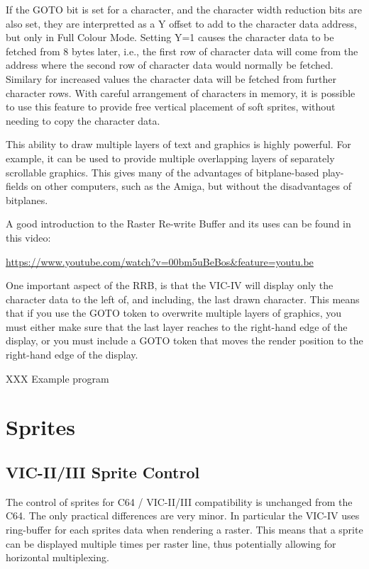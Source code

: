 If the GOTO bit is set for a character, and the character width reduction bits are also set, they are interpretted as a Y offset to add to the character data address, but only in Full Colour Mode.  Setting Y=1 causes the character data to be fetched from 8 bytes later, i.e., the first row of character data will come from the address where the second row of character data would normally be fetched.  Similary for increased values the character data will be fetched from further character rows.  With careful arrangement of characters in memory, it is possible to use this feature to provide free vertical placement of soft sprites, without needing to copy the character data.

This ability to draw multiple layers of text and graphics is highly powerful. For example, it can be used to provide multiple overlapping
layers of separately scrollable graphics.  This gives many of the advantages of bitplane-based play-fields on other computers, such as the
Amiga, but without the disadvantages of bitplanes.

A good introduction to the Raster Re-write Buffer and its uses can be found in this video:

\url{https://www.youtube.com/watch?v=00bm5uBeBos&feature=youtu.be}

One important aspect of the RRB, is that the VIC-IV will display only the character data to the left of, and including, the last drawn character.  This means that if you use the GOTO token to overwrite multiple layers of graphics, you must either make sure that the last layer
reaches to the right-hand edge of the display, or you must include a GOTO token that moves the render position to the right-hand edge of the display.


XXX Example program

\section{Sprites}

\subsection{VIC-II/III Sprite Control}

The control of sprites for C64 / VIC-II/III compatibility is unchanged from the C64.  The only practical differences are very minor.
In particular the VIC-IV uses ring-buffer for each sprites data when rendering a raster. This means that a sprite can be displayed multiple times per raster line, thus potentially allowing for horizontal multiplexing.

